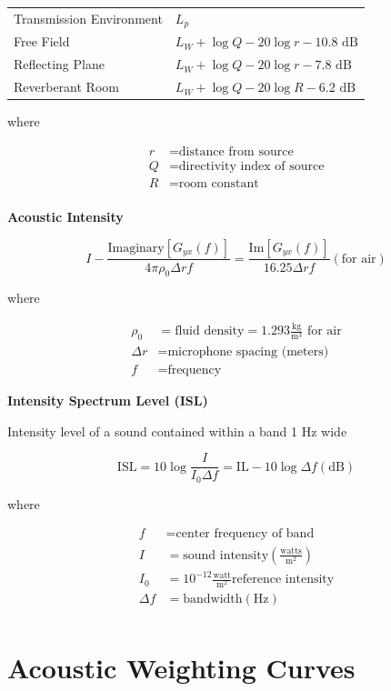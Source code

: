 \documentclass[
]{book}
\begin{document}
\begin{longtable}[]{@{}ll@{}}
\toprule
\endhead
Transmission Environment & \(L_p\)\tabularnewline
Free Field & \(L_W + \log Q - 20 \log r - 10.8 \text{ dB}\)\tabularnewline
Reflecting Plane & \(L_W + \log Q - 20 \log r - 7.8 \text{ dB}\)\tabularnewline
Reverberant Room & \(L_W + \log Q - 20 \log R - 6.2 \text{ dB}\)\tabularnewline
\bottomrule
\end{longtable}

where

\begin{align}
r &= \text{distance from source}\\
Q &= \text{directivity index of source}\\
R &= \text{room constant}\\
\end{align}

\textbf{Acoustic Intensity}

\[
I - \frac{\text{Imaginary} \left[ G_{yx} \left( f \right) \right]}{4 \pi \rho_0 \Delta r f} = \frac{\text{Im} \left[ G_{yx} \left( f \right) \right]}{16.25 \Delta r f} \left( \text{for air} \right)
\]

where

\begin{align}
\rho_0 &= \text{fluid density} = 1.293 \frac{\text{kg}}{\text{m}^3} \text{ for air}\\
\Delta r &= \text{microphone spacing (meters)}\\
f &= \text{frequency}
\end{align}

\textbf{Intensity Spectrum Level (ISL)}

Intensity level of a sound contained within a band 1 \(\text{Hz}\) wide

\[
\mathrm{ISL} = 10 \log \frac{I}{I_0 \Delta f} = \mathrm{IL} - 10 \log \Delta f \left( \text{dB} \right)
\]

where

\begin{align}
f &= \text{center frequency of band} \\
I &= \text{sound intensity} \left( \frac{\text{watts}}{\text{m}^2} \right) \\
I_0 &= 10^{-12} \frac{\text{watt}}{\text{m}^2} \text{reference intensity} \\
\Delta f &= \text{bandwidth} \left( \text{Hz} \right) \\
\end{align}

\hypertarget{acoustic-weighting-curves}{%
\section{Acoustic Weighting Curves}\label{acoustic-weighting-curves}}
\end{document}
